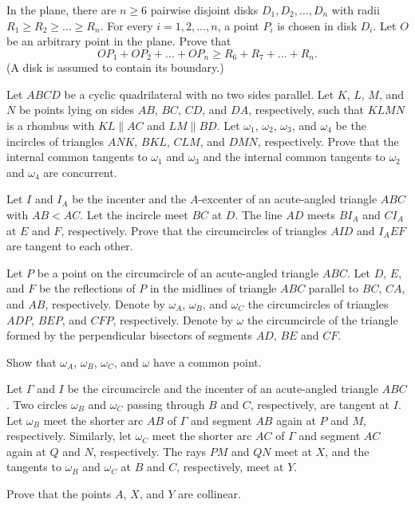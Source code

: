 \begin{probMG}[ISL 2020/G4]
	In the plane, there are $n\ge 6$ pairwise disjoint disks $D_1,D_2,\dots,D_n$ with radii $R_1\ge R_2\ge\dots\ge R_n$. For every $i=1,2,\dots,n$, a point $P_i$ is chosen in disk $D_i$. Let $O$ be an arbitrary point in the plane. Prove that
	\[OP_1+OP_2+\dots+OP_n\ge R_6+R_7+\dots+R_n.\]
	(A disk is assumed to contain its boundary.)
\end{probMG}

\begin{probMG}[ISL 2020/G5]
	Let $ABCD$ be a cyclic quadrilateral with no two sides parallel. Let $K$, $L$, $M$, and $N$ be points lying on sides $AB$, $BC$, $CD$, and $DA$, respectively, such that $KLMN$ is a rhombus with $KL\parallel AC$ and $LM\parallel BD$. Let $\omega_1$, $\omega_2$, $\omega_3$, and $ \omega_4$ be the incircles of triangles $ANK$, $BKL$, $CLM$, and $DMN$, respectively. Prove that the internal common tangents to $\omega_1$ and $\omega_3$ and the internal common tangents to $\omega_2$ and $\omega_4$ are concurrent.
\end{probMG}

\begin{probMG}[ISL 2020/G6]
	Let $I$ and $I_A$ be the incenter and the $A$-excenter of an acute-angled triangle $ABC$ with $AB<AC$. Let the incircle meet $BC$ at $D$. The line $AD$ meets $BI_A$ and $CI_A$ at $E$ and $F$, respectively. Prove that the circumcircles of triangles $AID$ and $I_AEF$ are tangent to each other.
\end{probMG}

\begin{probMG}[ISL 2020/G7]
	Let $P$ be a point on the circumcircle of an acute-angled triangle $ABC$. Let $D$, $E$, and $F$ be the reflections of $P$ in the midlines of triangle $ABC$ parallel to $BC$, $CA$, and $AB$, respectively. Denote by $\omega_A$, $\omega_B$, and $\omega_C$ the circumcircles of triangles $ADP$, $BEP$, and $CFP$, respectively. Denote by $\omega$ the circumcircle of the triangle formed by the perpendicular bisectors of segments $AD$, $BE$ and $CF$.

	Show that $\omega_A$, $\omega_B$, $\omega_C$, and $\omega$ have a common point.
\end{probMG}

\begin{probHG}[ISL 2020/G8]
	Let $\Gamma$ and $I$ be the circumcircle and the incenter of an acute-angled triangle $ABC$. Two circles $\omega_B$ and $\omega_C$ passing through $B$ and $C$, respectively, are tangent at $I$. Let $\omega_B$ meet the shorter arc $AB$ of $\Gamma$ and segment $AB$ again at $P$ and $M$, respectively. Similarly, let $\omega_C$ meet the shorter arc $AC$ of $\Gamma$ and segment $AC$ again at $Q$ and $N$, respectively. The rays $PM$ and $QN$ meet at $X$, and the tangents to $\omega_B$ and $\omega_C$ at $B$ and $C$, respectively, meet at $Y$.

	Prove that the points $A$, $X$, and $Y$ are collinear.
\end{probHG}

